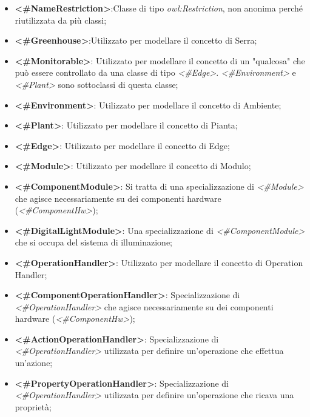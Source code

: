 \begin{itemize}
	\item \textbf{<\#NameRestriction>}:Classe di tipo \textit{owl:Restriction}, non anonima perché riutilizzata da più classi;

	\item \textbf{<\#Greenhouse>}:Utilizzato per modellare il concetto di Serra;

	\item \textbf{<\#Monitorable>}: Utilizzato per modellare il concetto di un "qualcosa" che può essere controllato da una classe di tipo \textit{<\#Edge>}. \textit{<\#Environment>} e \textit{<\#Plant>} sono sottoclassi di questa classe;

	\item \textbf{<\#Environment>}: Utilizzato per modellare il concetto di Ambiente;

	\item \textbf{<\#Plant>}: Utilizzato per modellare il concetto di Pianta;

	\item \textbf{<\#Edge>}: Utilizzato per modellare il concetto di Edge;

	\item \textbf{<\#Module>}: Utilizzato per modellare il concetto di Modulo;

	\item \textbf{<\#ComponentModule>}: Si tratta di una specializzazione di \textit{<\#Module>} che agisce necessariamente su dei componenti hardware (\textit{<\#ComponentHw>});

	\item \textbf{<\#DigitalLightModule>}: Una specializzazione di \textit{<\#ComponentModule>} che si occupa del sistema di illuminazione;

	\item \textbf{<\#OperationHandler>}: Utilizzato per modellare il concetto di Operation Handler;

	\item \textbf{<\#ComponentOperationHandler>}: Specializzazione di \textit{<\#OperationHandler>} che agisce necessariamente su dei componenti hardware (\textit{<\#ComponentHw>});

	\item \textbf{<\#ActionOperationHandler>}: Specializzazione di \textit{<\#OperationHandler>} utilizzata per definire un'operazione che effettua un'azione;

	\item \textbf{<\#PropertyOperationHandler>}: Specializzazione di \textit{<\#OperationHandler>} utilizzata per definire un'operazione che ricava una proprietà;


\end{itemize}
